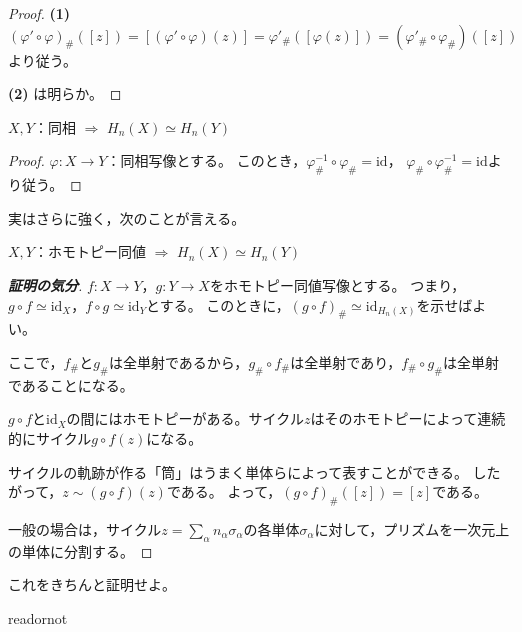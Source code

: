 \documentclass[uplatex]{jsarticle}
\begin{document}
\begin{proof}
  {\bf (1)} $\left( \varphi' \circ \varphi \right)_{\#}([z]) = [(\varphi' \circ \varphi)(z)] = \varphi'_{\#} \left( [\varphi (z)] \right) = (\varphi'_{\#} \circ \varphi_{\#}) ([z])$より従う。

  {\bf (2)} は明らか。
\end{proof}

\begin{teiri}
  $X,Y$：同相 $\Longrightarrow$ $H_{n}(X) \simeq H_{n}(Y)$
\end{teiri}

\begin{proof}
  $\varphi \colon X \longrightarrow Y$：同相写像とする。
  このとき，$\varphi^{-1}_{\#} \circ \varphi_{\#} = \mathrm{id}$，
  $\varphi_{\#} \circ \varphi^{-1}_{\#} = \mathrm{id}$より従う。
\end{proof}

実はさらに強く，次のことが言える。

\begin{teiri}
  $X,Y$：ホモトピー同値 $\Longrightarrow$ $H_{n}(X) \simeq H_{n}(Y)$
\end{teiri}

\begin{proof}[{\bf 証明の気分}]
  $f \colon X \longrightarrow Y$，$g \colon Y \longrightarrow X$をホモトピー同値写像とする。
  つまり，$g \circ f \simeq \mathrm{id}_{X}$，$f \circ g \simeq \mathrm{id}_{Y}$とする。
  このときに，$(g \circ f)_{\#} \simeq \mathrm{id}_{H_{n}(X)}$を示せばよい。
  
  ここで，$f_{\#}$と$g_{\#}$は全単射であるから，$g_{\#} \circ f_{\#}$は全単射であり，$f_{\#} \circ g_{\#}$は全単射であることになる。

  $g \circ f$と$\mathrm{id}_{X}$の間にはホモトピーがある。サイクル$z$はそのホモトピーによって連続的にサイクル$g \circ f (z)$になる。

  サイクルの軌跡が作る「筒」はうまく単体らによって表すことができる。
  したがって，$z \sim (g \circ f)(z)$である。
  よって，$(g \circ f)_{\#} ([z]) = [z]$である。

  一般の場合は，サイクル${\displaystyle z = \sum_{\alpha} n_{\alpha} \sigma_{\alpha}}$の各単体$\sigma_{\alpha}$に対して，プリズムを一次元上の単体に分割する。
\end{proof}

 これをきちんと証明せよ。

\expandafter\ifx\csname readornot\endcsname\relax
  
\end{document}
